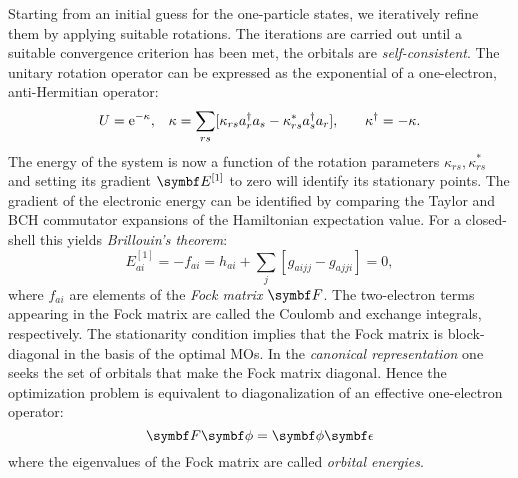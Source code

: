 Starting from an initial guess for the one-particle states, we
iteratively refine them by applying suitable rotations.
The iterations are carried out until a suitable convergence criterion
has been met, \ie the orbitals are \emph{self-consistent}.
The unitary rotation operator can be expressed as the exponential of a
one-electron, anti-Hermitian operator:
\begin{alignat}{3}
  U = \mathrm{e}^{-\kappa},
  \quad&
  \kappa = \sum_{rs}
  [\kappa_{rs} a_{r}^{\dagger}a_{s} - \kappa^*_{rs}a_{s}^{\dagger}a_{r}],
  \quad&
  \kappa^\dagger = -\kappa.
\end{alignat}
The energy of the system is now a function of the rotation parameters
$\kappa_{rs}, \kappa^*_{rs}$ and setting its gradient $\mat{E}^{[1]}$ to
zero will identify its stationary points. The gradient of the electronic
energy can be identified by comparing the Taylor and \gls{BCH}
commutator expansions of the Hamiltonian expectation value.
For a closed-shell this yields \emph{Brillouin's theorem}:
\begin{equation}\label{eq:brillouin}
  E^{[1]}_{ai} = -f_{ai}
 = h_{ai} + \sum_{j}[g_{aijj} - g_{ajji}] = 0,
\end{equation}
where $f_{ai}$ are elements of the \emph{Fock matrix} $\mat{F}$.
The two-electron terms appearing in the Fock matrix are called the
Coulomb and exchange integrals, respectively.
The stationarity condition implies that the Fock matrix is
block-diagonal in the basis of the optimal \glspl{MO}.
In the \emph{canonical representation} one seeks the set of orbitals
that make the Fock matrix diagonal. Hence the optimization problem is
equivalent to diagonalization of an effective one-electron operator:
\begin{equation}\label{eq:fock-eq}
 \mat{F}\vect{\phi} = \vect{\phi}\mat{\epsilon}
\end{equation}
where the eigenvalues of the Fock matrix are called \emph{orbital
energies}.

